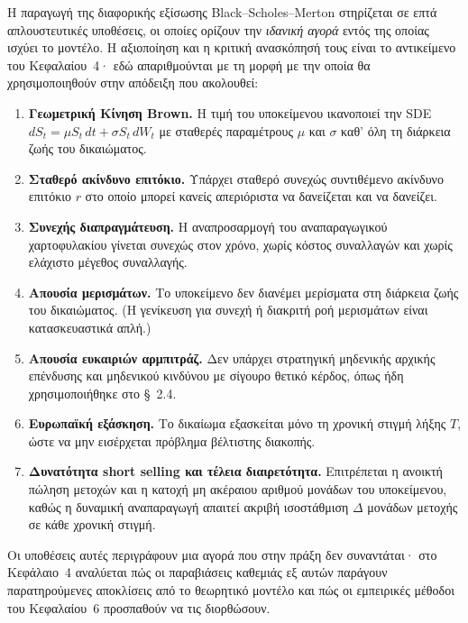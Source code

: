 \documentclass[12pt]{article}
\begin{document}
Η παραγωγή της διαφορικής εξίσωσης Black–Scholes–Merton στηρίζεται σε επτά απλουστευτικές υποθέσεις, οι οποίες ορίζουν την \emph{ιδανική αγορά} εντός της οποίας ισχύει το μοντέλο. Η αξιοποίηση και η κριτική ανασκόπησή τους είναι το αντικείμενο του Κεφαλαίου~4· εδώ απαριθμούνται με τη μορφή με την οποία θα χρησιμοποιηθούν στην απόδειξη που ακολουθεί:

\begin{enumerate}
  \item \textbf{Γεωμετρική Κίνηση Brown.} Η τιμή του υποκείμενου ικανοποιεί την SDE $dS_t = \mu S_t\,dt + \sigma S_t\,dW_t$ με σταθερές παραμέτρους $\mu$ και $\sigma$ καθ' όλη τη διάρκεια ζωής του δικαιώματος.

  \item \textbf{Σταθερό ακίνδυνο επιτόκιο.} Υπάρχει σταθερό συνεχώς συντιθέμενο ακίνδυνο επιτόκιο $r$ στο οποίο μπορεί κανείς απεριόριστα να δανείζεται και να δανείζει.

  \item \textbf{Συνεχής διαπραγμάτευση.} Η αναπροσαρμογή του αναπαραγωγικού χαρτοφυλακίου γίνεται συνεχώς στον χρόνο, χωρίς κόστος συναλλαγών και χωρίς ελάχιστο μέγεθος συναλλαγής.

  \item \textbf{Απουσία μερισμάτων.} Το υποκείμενο δεν διανέμει μερίσματα στη διάρκεια ζωής του δικαιώματος. (Η γενίκευση για συνεχή ή διακριτή ροή μερισμάτων είναι κατασκευαστικά απλή.)

  \item \textbf{Απουσία ευκαιριών αρμπιτράζ.} Δεν υπάρχει στρατηγική μηδενικής αρχικής επένδυσης και μηδενικού κινδύνου με σίγουρο θετικό κέρδος, όπως ήδη χρησιμοποιήθηκε στο \S~2.4.

  \item \textbf{Ευρωπαϊκή εξάσκηση.} Το δικαίωμα εξασκείται μόνο τη χρονική στιγμή λήξης $T$, ώστε να μην εισέρχεται πρόβλημα βέλτιστης διακοπής.

  \item \textbf{Δυνατότητα short selling και τέλεια διαιρετότητα.} Επιτρέπεται η ανοικτή πώληση μετοχών και η κατοχή μη ακέραιου αριθμού μονάδων του υποκείμενου, καθώς η δυναμική αναπαραγωγή απαιτεί ακριβή ισοστάθμιση $\Delta$ μονάδων μετοχής σε κάθε χρονική στιγμή.
\end{enumerate}

Οι υποθέσεις αυτές περιγράφουν μια αγορά που στην πράξη δεν συναντάται· στο Κεφάλαιο~4 αναλύεται πώς οι παραβιάσεις καθεμιάς εξ αυτών παράγουν παρατηρούμενες αποκλίσεις από το θεωρητικό μοντέλο και πώς οι εμπειρικές μέθοδοι του Κεφαλαίου~6 προσπαθούν να τις διορθώσουν.
\end{document}
